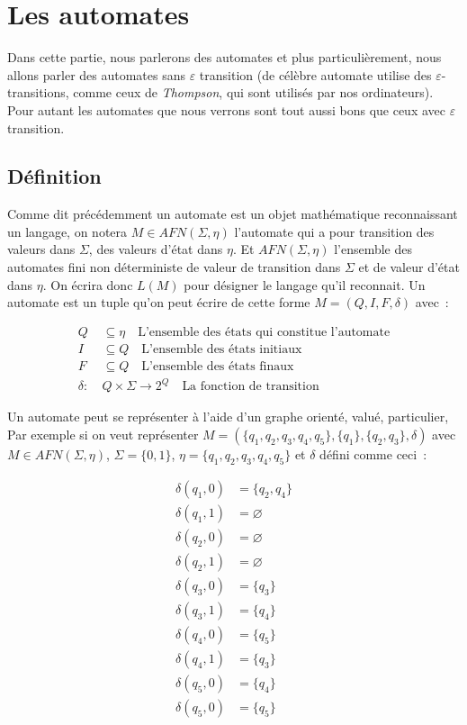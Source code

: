 \section{Les automates}

Dans cette partie, nous parlerons des automates et plus particulièrement, nous
allons parler des automates sans \(\varepsilon\) transition (de célèbre
automate utilise des \(\varepsilon\)-transitions, comme ceux de
\textit{Thompson}, qui sont utilisés par nos ordinateurs). Pour autant les
automates que nous verrons sont tout aussi bons que ceux avec \(\varepsilon\)
transition.

\subsection{Définition}

Comme dit précédemment un automate est un objet mathématique reconnaissant un
langage, on notera \(M \in AFN(\Sigma, \eta)\) l'automate qui a pour transition
des valeurs dans \(\Sigma\), des valeurs \og{}d'état\fg{} dans \(\eta\). Et
\(AFN(\Sigma, \eta)\) l'ensemble des automates fini non déterministe de valeur
de transition dans \(\Sigma\) et de valeur d'état dans \(\eta\). On écrira donc
\(L(M)\) pour désigner le langage qu'il reconnait. Un automate est un tuple
qu'on peut écrire de cette forme \(M = (Q, I, F, \delta)\) avec~:

\begin{align}
    Q        & \subseteq \eta \quad \text{L'ensemble des états qui constitue l'automate} \\
    I        & \subseteq Q \quad \text{L'ensemble des états initiaux}                    \\
    F        & \subseteq Q \quad \text{L'ensemble des états finaux}                      \\
    \delta:~ & Q \times \Sigma \to 2^Q \quad \text{La fonction de transition}
\end{align}

Un automate peut se représenter à l'aide d'un graphe orienté, valué,
particulier, Par exemple si on veut représenter \(M = (\{q_1, q_2, q_3, q_4,
q_5\}, \{q_1\},\{q_2, q_3\}, \delta)\) avec \(M \in AFN(\Sigma, \eta)\),
\(\Sigma = \{0, 1\}\), \(\eta = \{q_1, q_2, q_3, q_4, q_5\}\) et \(\delta\)
défini comme ceci~:

\begin{align*}
    \delta(q_1, 0) & = \{q_2, q_4\} \\
    \delta(q_1, 1) & = \varnothing  \\
    \delta(q_2, 0) & = \varnothing  \\
    \delta(q_2, 1) & = \varnothing  \\
    \delta(q_3, 0) & = \{q_3\}      \\
    \delta(q_3, 1) & = \{q_4\}      \\
    \delta(q_4, 0) & = \{q_5\}      \\
    \delta(q_4, 1) & = \{q_3\}      \\
    \delta(q_5, 0) & = \{q_4\}      \\
    \delta(q_5, 0) & = \{q_5\}      \\
\end{align*}

